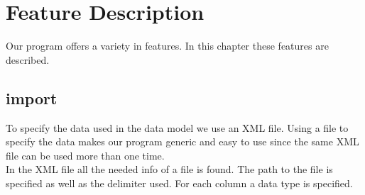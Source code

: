 \chapter{Feature Description}
Our program offers a variety in features. In this chapter these features are described.


\section{import}

To specify the data used in the data model we use an XML file. Using a file to specify the data makes our program generic and easy to use since the same XML file can be used more than one time. \\
In the XML file all the needed info of a file is found. The path to the file is specified as well as the delimiter used. For each column a data type is specified. 




